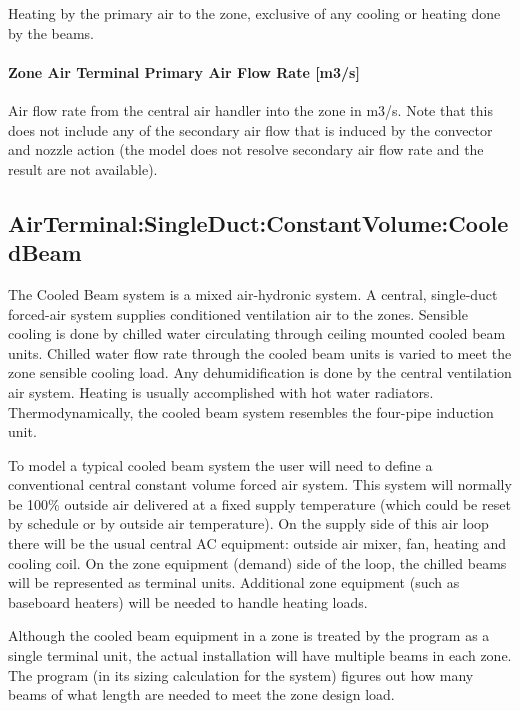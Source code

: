 Heating by the primary air to the zone, exclusive of any cooling or heating done by the beams.

\paragraph{Zone Air Terminal Primary Air Flow Rate {[}m3/s{]}}\label{zone-air-terminal-primary-air-flow-rate-m3s}

Air flow rate from the central air handler into the zone in m3/s. Note that this does not include any of the secondary air flow that is induced by the convector and nozzle action (the model does not resolve secondary air flow rate and the result are not available).

\subsection{AirTerminal:SingleDuct:ConstantVolume:CooledBeam}\label{airterminalsingleductconstantvolumecooledbeam}

The Cooled Beam system is a mixed air-hydronic system. A central, single-duct forced-air system supplies conditioned ventilation air to the zones. Sensible cooling is done by chilled water circulating through ceiling mounted cooled beam units. Chilled water flow rate through the cooled beam units is varied to meet the zone sensible cooling load. Any dehumidification is done by the central ventilation air system. Heating is usually accomplished with hot water radiators. Thermodynamically, the cooled beam system resembles the four-pipe induction unit.

To model a typical cooled beam system the user will need to define a conventional central constant volume forced air system. This system will normally be 100\% outside air delivered at a fixed supply temperature (which could be reset by schedule or by outside air temperature). On the supply side of this air loop there will be the usual central AC equipment: outside air mixer, fan, heating and cooling coil. On the zone equipment (demand) side of the loop, the chilled beams will be represented as terminal units. Additional zone equipment (such as baseboard heaters) will be needed to handle heating loads.

Although the cooled beam equipment in a zone is treated by the program as a single terminal unit, the actual installation will have multiple beams in each zone. The program (in its sizing calculation for the system) figures out how many beams of what length are needed to meet the zone design load.

